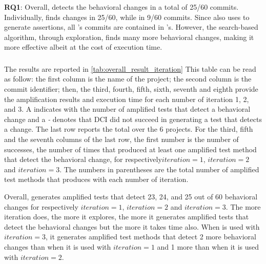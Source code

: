 \begin{mdframed}
\textbf{RQ1}: Overall, \DCI detects the behavioral changes in a total of 25/60 commits. 
Individually, \DCII finds changes in 25/60, while \DCIA in 9/60 commits.
Since \DCII also uses \aampl to generate assertions, all \DCIA's commits are contained in \DCII's. 
However, the search-based algorithm, through exploration, finds many more behavioral changes, making it more effective albeit at the cost of execution time.
\end{mdframed}


\subsubsection{\rqiteration}
\label{subsubsec:dci:evaluation:rq2}

The results are reported in \autoref{tab:overall_result_iteration}
This table can be read as follow:
the first column is the name of the project;
the second column is the commit identifier;
then, the third, fourth, fifth, sixth, seventh and eighth provide the amplification results and execution time for each number of iteration 1, 2, and 3. 
A \cmark indicates with the number of amplified tests that detect a behavioral change and a \textit{-} denotes that DCI did not succeed in generating a test that detects a change.
The last row reports the total over the 6 projects.
For the third, fifth and the seventh columns of the last row, the first number is the number of successes, \ie the number of times that \DCI produced at least one amplified test method that detect the behavioral change, for respectively$iteration=1$, $iteration=2$ and $iteration=3$.
The numbers in parentheses are the total number of amplified test methods that \DCI produces with each number of iteration.

Overall, \DCII generates amplified tests that detect 23, 24, and 25 out of 60 behavioral changes for respectively $iteration=1$, $iteration=2$ and $iteration=3$.
The more iteration \DCII does, the more it explores, the more it generates amplified tests that detect the behavioral changes but the more it takes time also.
When \DCII is used with $iteration=3$, it generates amplified test methods that detect 2 more behavioral changes than when it is used with $iteration=1$ and 1 more than when it is used with $iteration=2$.

